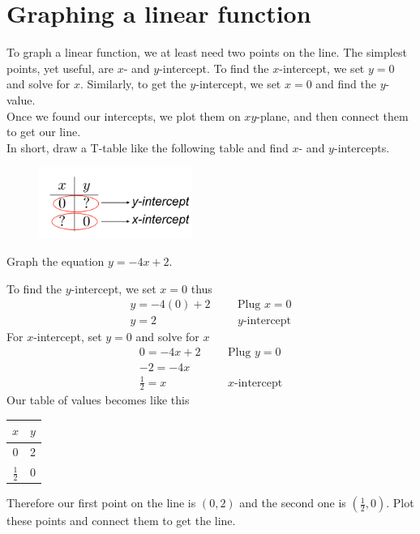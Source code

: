 \section{Graphing a linear function}
To graph a linear function, we at least need two points on the line. The simplest points, yet useful, are $x$- and $y$-intercept. To find the $x$-intercept, we set $y=0$ and solve for $x$. Similarly, to get the $y$-intercept, we set $x=0$ and find the $y$-value.\\
Once we found our intercepts, we plot them on $xy$-plane, and then connect them to get our line.\\
In short, draw a T-table like the following table and find $x$- and $y$-intercepts.
\begin{figure}[ht]
	\centering
    \includegraphics[width=5cm]{Pics/table_intercept.png}
\end{figure}
\begin{exa}
	Graph the equation $y=-4x+2$.
\end{exa}
To find the $y$-intercept, we set $x=0$ thus
\begin{align*}
		y =-4(0)+2& &   &\text{Plug $x=0$} \\
        y = 2& &&\text{$y$-intercept}
\end{align*}
For $x$-intercept, set $y=0$ and solve for $x$
\begin{align*}
		0 = -4x+2&  &&\text{Plug $y=0$} \\
        -2  =-4x& && \\
        \frac{1}{2}  = x& &&\text{$x$-intercept}
\end{align*}
Our table of values becomes like this
\begin{center}
\begin{tabular}{ c | c }
    $x$ & $y$ \\ \hline
    0	&  2 \\
    $\displaystyle \frac{1}{2}$   &  0  
\end{tabular}
\end{center}
Therefore our first point on the line is $(0,2)$ and the second one is $\left(\frac{1}{2}, 0\right) $. Plot these points and connect them to get the line.
\begin{center}
\end{center}
